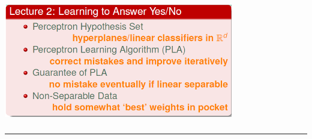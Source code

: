 \documentclass{article}
\begin{document}
\begin{center}
\includegraphics[width=10cm, height=5.5cm]{lecture2_sum}\\
\end{center}

\noindent
{\color{RubineRed} \rule{\linewidth}{1mm} }
\end{document}
